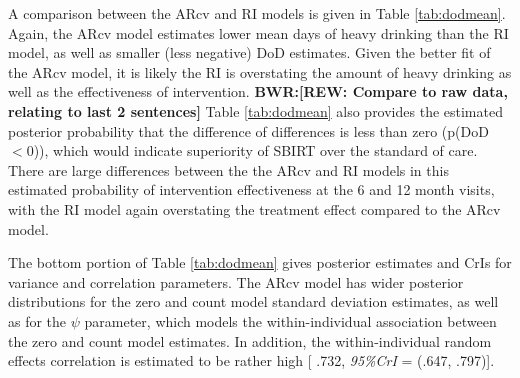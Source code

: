 \documentclass[12pt]{article}
\def\bwr#1{{\color{violet}\textbf{BWR:[#1]}}}
\begin{document}
A comparison between the ARcv and RI models is given in Table \ref{tab:dodmean}. Again, the ARcv model estimates lower mean days of heavy drinking than the RI model, as well as smaller (less negative) DoD estimates. Given the better fit of the ARcv model, it is likely the RI is overstating the amount of heavy drinking as well as the effectiveness of intervention. \bwr{REW: Compare to raw data, relating to last 2 sentences} Table \ref{tab:dodmean} also provides the estimated posterior probability that the difference of differences is less than zero (p(DoD$<0$)), which would indicate superiority of SBIRT over the standard of care. There are large differences between the the ARcv and RI models in this estimated probability of intervention effectiveness at the 6 and 12 month visits, with the RI model again overstating the treatment effect compared to the ARcv model. 

The bottom portion of Table \ref{tab:dodmean} gives posterior estimates and CrIs for variance and correlation parameters. The ARcv model has wider posterior distributions for the zero and count model standard deviation estimates, as well as for the $\psi$ parameter, which models the within-individual association between the zero and count model estimates. In addition, the within-individual random effects correlation is estimated to be rather high [ .732, \textit{95\%CrI} = (.647, .797)].
\end{document}
